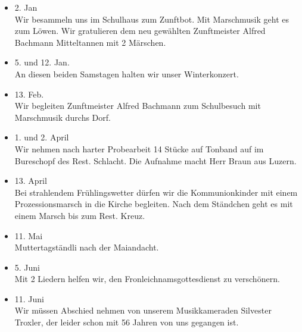 \begin{history}


    \begin{itemize}

        \item[]2. Jan\\
        Wir besammeln uns im Schulhaus zum Zunftbot. Mit Marschmusik geht es zum
        Löwen. Wir gratulieren dem neu gewählten Zunftmeister Alfred Bachmann
        Mitteltannen mit 2 Märschen.

        \item[]5. und 12. Jan.\\
        An diesen beiden Samstagen halten wir unser Winterkonzert.

        \item[]13. Feb.\\
        Wir begleiten Zunftmeister Alfred Bachmann zum Schulbesuch mit
        Marschmusik durchs Dorf.

        \item[]1. und 2. April\\
        Wir nehmen nach harter Probearbeit 14 Stücke auf Tonband auf im
        Bureschopf des Rest. Schlacht. Die Aufnahme macht Herr Braun aus Luzern.

        \item[]13. April\\
        Bei strahlendem Frühlingswetter dürfen wir die Kommunionkinder mit einem
        Prozessionsmarsch in die Kirche begleiten. Nach dem Ständchen geht es
        mit einem Marsch bis zum Rest. Kreuz.

        \item[]11. Mai\\
        Muttertagständli nach der Maiandacht.

        \item[]5. Juni\\
        Mit 2 Liedern helfen wir, den Fronleichnamsgottesdienst zu verschönern.

        \item[]11. Juni\\
        Wir müssen Abschied nehmen von unserem Musikkameraden Silvester Troxler,
        der leider schon mit 56 Jahren von uns gegangen ist.


\end{itemize}
\end{history}
